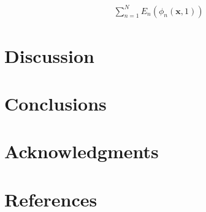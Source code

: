 \documentclass[preprint,authoryear,review,12pt]{elsarticle}
\begin{document}
\begin{align}
  \sum_{n=1}^N E_{n}(\phi_n(\mathbf{x},1))
\end{align}


\section*{Discussion} 

\section*{Conclusions}





\section*{Acknowledgments}

\section*{References}










\end{document}
